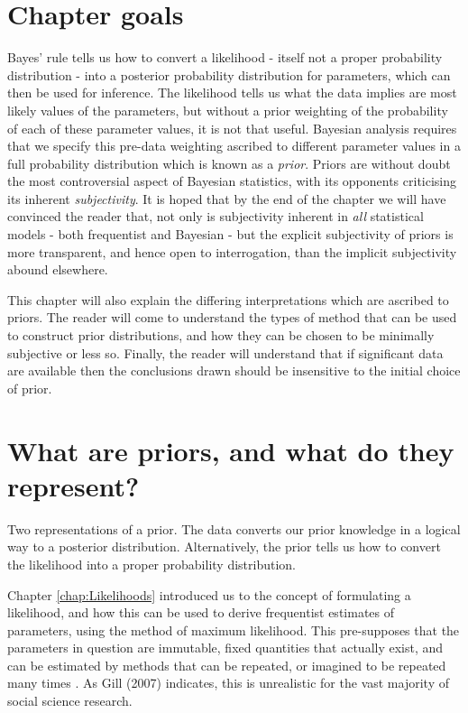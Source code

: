 \documentclass[11pt,fullpage]{book}
\begin{document}
\section{Chapter goals}
Bayes' rule tells us how to convert a likelihood - itself not a proper probability distribution - into a posterior probability distribution for parameters, which can then be used for inference. The likelihood tells us what the data implies are most likely values of the parameters, but without a prior weighting of the probability of each of these parameter values, it is not that useful. Bayesian analysis requires that we specify this pre-data weighting ascribed to different parameter values in a full probability distribution which is known as a \textit{prior}. Priors are without doubt the most controversial aspect of Bayesian statistics, with its opponents criticising its inherent \textit{subjectivity}. It is hoped that by the end of the chapter we will have convinced the reader that, not only is subjectivity inherent in \textit{all} statistical models - both frequentist and Bayesian - but the explicit subjectivity of priors is more transparent, and hence open to interrogation, than the implicit subjectivity abound elsewhere.

This chapter will also explain the differing interpretations which are ascribed to priors. The reader will come to understand the types of method that can be used to construct prior distributions, and how they can be chosen to be minimally subjective or less so. Finally, the reader will understand that if significant data are available then the conclusions drawn should be insensitive to the initial choice of prior.

\section{What are priors, and what do they represent?}
Two representations of a prior. The data converts our prior knowledge in a logical way to a posterior distribution. Alternatively, the prior tells us how to convert the likelihood into a proper probability distribution.

Chapter \ref{chap:Likelihoods} introduced us to the concept of formulating a likelihood, and how this can be used to derive frequentist estimates of parameters, using the method of maximum likelihood. This pre-supposes that the parameters in question are immutable, fixed quantities that actually exist, and can be estimated by methods that can be repeated, or imagined to be repeated many times \cite{gill2007bayesian}. As Gill (2007) indicates, this is unrealistic for the vast majority of social science research.
\end{document}
